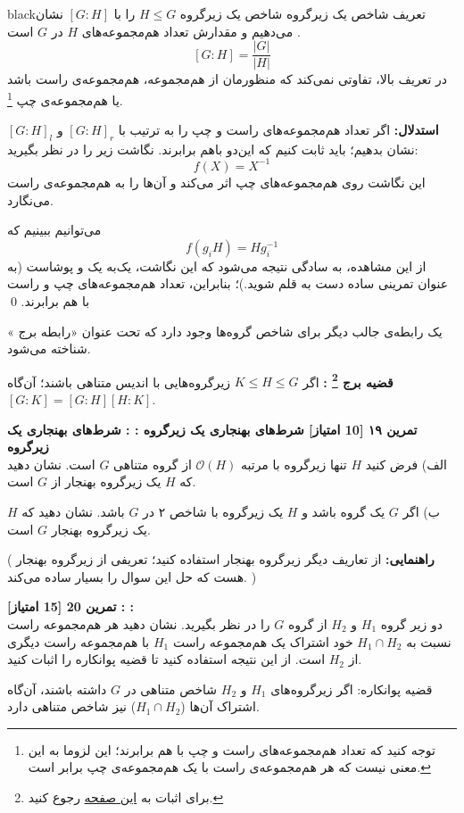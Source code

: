 \documentclass{article}
\newenvironment{exercise}[3][\unskip]{%
	\par
	\noindent
	\textbf{تمرین
		#1
		[#2 امتیاز] 
		\def\temp{#3}\ifx\temp\empty
		: 
		\else
		: #3 \vspace{0.5em} \\ \noindent
		\fi
}}{}
\begin{document}
\begin{boxes}{black}{تعریف شاخص یک زیرگروه}
	شاخص
	 یک زیرگروه $H\leq G$
	را با 
	$[G:H]$
	نشان می‌دهیم و مقدارش تعداد هم‌مجموعه‌های 
	$H$ در $G$ است
	.
	\[
	[G:H] = \frac{|G|}{|H|}
	\]
  در تعریف بالا، تفاوتی نمی‌کند که منظورمان از هم‌مجموعه، هم‌مجموعه‌‌ی راست باشد یا هم‌مجموعه‌ی چپ
 \footnote{توجه کنید که تعداد هم‌مجموعه‌های راست و چپ با هم برابرند؛ این لزوما به این معنی نیست که هر هم‌مجموعه‌ی راست با یک هم‌مجموعه‌ی چپ برابر است.}.
	
	\vspace{0.6em}
	\textbf{استدلال:}
	اگر تعداد هم‌مجموعه‌های راست و چپ را به ترتیب با
	$[G:H]_r$
	و
	$[G:H]_l$
	نشان بدهیم؛ باید ثابت کنیم که این‌دو باهم برابرند.
	نگاشت زیر را در نظر بگیرید:
	\[
	f(X) = X^{-1}
	\]
	این نگاشت روی هم‌مجموعه‌های چپ اثر می‌کند و آن‌ها را به هم‌مجموعه‌ی راست می‌نگارد.
	
	می‌توانیم ببینیم که 
	\[
	f(g_iH)=Hg_i^{-1}
	\]
	از این مشاهده، به سادگی نتیجه می‌شود که این نگاشت، یک‌به یک و پوشاست (به عنوان تمرینی ساده دست به قلم شوید.)؛
	بنابراین، تعداد هم‌مجموعه‌های چپ و راست با هم برابرند.
	\qed
	
	یک رابطه‌ی جالب دیگر برای شاخص گروه‌ها وجود دارد که تحت عنوان «رابطه برج
	» شناخته می‌شود.

\vspace{0.6em}
\textbf{قضیه برج
	\footnote{برای اثبات به 
	\href{https://proofwiki.org/wiki/Tower_Law_for_Subgroups}{این صفحه}
	رجوع کنید.}
	:}
اگر 
$K\leq H\leq G$
زیرگروه‌هایی با اندیس متناهی باشند؛ آن‌گاه
$[G:K] = [G:H][H:K]$.
\end{boxes}
\vspace{1em}

\begin{exercise}[۱۹]{10}{شرط‌‌های بهنجاری یک زیرگروه}
	الف) فرض کنید 
	$H$ 
	تنها زیرگروه با مرتبه 
	$\mathcal{O}(H)$ 
	از گروه متناهی 
	$G$ 
	است. نشان دهید که 
	$H$ 
	یک زیرگروه بهنجار از
	$G$ 
	است. 
	
	\noindent
	ب)
	اگر 
	$G$ 
	یک گروه باشد و 
	$H$ 
	یک زیرگروه با شاخص ۲ در 
	$G$ 
	باشد. نشان دهید که 
	$H$ 
	یک زیرگروه بهنجار 
	$G$ 
	است.
	
	\noindent
	(
	\textbf{راهنمایی:}
	از تعاریف دیگر زیرگروه بهنجار استفاده کنید؛ تعریفی از زیرگروه بهنجار هست که حل این سوال را بسیار ساده می‌کند.
	)
\end{exercise}

\begin{exercise}[20]{15}{}
	دو زیر گروه 
	$H_1$ 
	و 
	$H_2$ 
	از گروه 
	$G$ 
	را در نظر بگیرید. نشان دهید هر هم‌مجموعه راست نسبت به 
	$H_1 \cap H_2$ 
	خود اشتراک یک هم‌مجموعه راست 
	$H_1$ 
	با هم‌مجموعه راست دیگری از 
	$H_2$ 
	است. از این نتیجه استفاده کنید تا قضیه پوانکاره را اثبات کنید. 
	\begin{mdframed}
		قضیه پوانکاره:‌ اگر 
		زیرگروه‌های 
		$H_1$ 
		و 
		$H_2$ 
		شاخص متناهی در 
		$G$ 
		داشته باشند، آن‌گاه اشتراک آن‌ها 
		($H_1 \cap H_2$) 
		نیز شاخص متناهی دارد.
	\end{mdframed}
\end{exercise}
\end{document}
